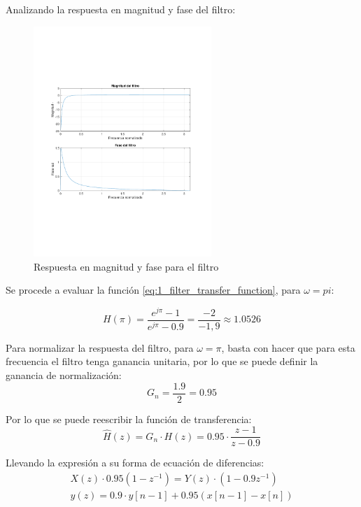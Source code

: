 		Analizando la respuesta en magnitud y fase del filtro:
		\begin{figure}[H]
			\center
			\includegraphics[width=0.6\textwidth,clip, trim = {1.9cm 6.8cm 2.3cm 7cm}]{../plots/1_mag_phase.pdf}
			\caption{Respuesta en magnitud y fase para el filtro}
		\end{figure}
		
		Se procede a evaluar la función \ref{eq:1_filter_transfer_function}, para $\omega = pi$:
		
		\begin{equation}
			H(\pi) = \frac{e^{j\pi} - 1}{e^{j\pi} - 0.9} = \frac{-2}{-1,9} \approx 1.0526
			\label{eq:1_filter_pi}
		\end{equation}
		
		Para normalizar la respuesta del filtro, para $\omega = \pi$, basta con hacer que para esta frecuencia el filtro tenga ganancia unitaria, por lo que se puede definir la ganancia de normalización:
		\begin{equation}
			G_{n} = \frac{1.9}{2} = 0.95
		\end{equation}
		
		Por lo que se puede reescribir la función de transferencia:
		\begin{equation}
			\hat{H}(z) = G_{n} \cdot H(z) = 0.95 \cdot \frac{z - 1}{z -0.9} 
			\label{eq:1_transfer_function_normal}
		\end{equation}
		
		Llevando la expresión a su forma de ecuación de diferencias:
		\begin{align}
			X(z) \cdot 0.95 ( 1 - z^{-1} ) = Y(z) \cdot (1 - 0.9 z^{-1}) \\
			y(z) = 0.9 \cdot y\left[ n - 1 \right] + 0.95 \left( x\left[ n - 1 \right] - x\left[n \right] \right)
		\end{align}
		
		
			